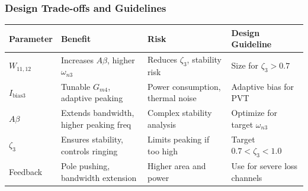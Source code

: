 \subsubsection*{Design Trade-offs and Guidelines}
\label{subsec:assfb_tradeoffs}

\begin{table}[H]
\centering
\label{tab:assfb_tradeoffs}
\begin{tabular}{ >{\raggedright\arraybackslash}p{} 
                 >{\raggedright\arraybackslash}p{} 
                 >{\raggedright\arraybackslash}p{} 
                 >{\raggedright\arraybackslash}p{} }
\toprule
\textbf{Parameter} & \textbf{Benefit} & \textbf{Risk} & \textbf{Design Guideline} \\
\midrule
$W_{11,12}$ & Increases $A\beta$, higher $\omega_{n3}$ & Reduces $\zeta_3$, stability risk & Size for $\zeta_3 > 0.7$ \\
\midrule
$I_{\text{bias3}}$ & Tunable $G_{m4}$, adaptive peaking & Power consumption, thermal noise & Adaptive bias for PVT \\
\midrule
$A\beta$ & Extends bandwidth, higher peaking freq & Complex stability analysis & Optimize for target $\omega_{n3}$ \\
\midrule
$\zeta_3$ & Ensures stability, controls ringing & Limits peaking if too high & Target $0.7 < \zeta_3 < 1.0$ \\
\midrule
Feedback & Pole pushing, bandwidth extension & Higher area and power & Use for severe loss channels \\
\bottomrule
\end{tabular}
\end{table}